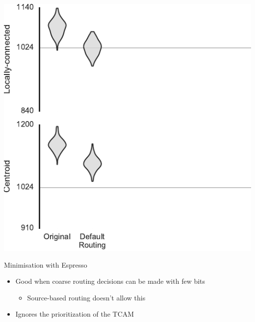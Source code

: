 \documentclass[t]{beamer}
\begin{document}
\begin{frame}[plain]{}
  \begin{center}
    \includegraphics[page=2]{../experiments/presentation_plots}
  \end{center}
\end{frame}

\begin{frame}{Minimisation with Espresso}
  \begin{itemize}
    \item Good when coarse routing decisions can be made with few bits
      \begin{itemize}
        \item Source-based routing doesn't allow this
      \end{itemize}
    \item Ignores the prioritization of the TCAM
  \end{itemize}
\end{frame}
\end{document}
